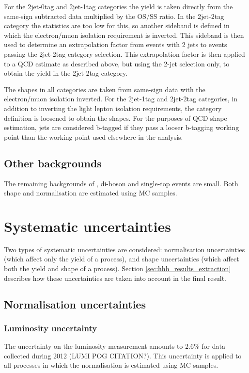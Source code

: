 For the 2jet-0tag and 2jet-1tag categories the yield is taken directly from
the same-sign subtracted data multiplied by the OS/SS ratio. In the 2jet-2tag
category the statistics are too low for this, so another sideband is defined
in which the electron/muon isolation requirement is inverted. This 
sideband is then used to determine an extrapolation factor from events
with 2 jets to events passing the 2jet-2tag category selection. This extrapolation
factor is then applied to a QCD estimate as described above, but using the 2-jet 
selection only, to obtain the yield in the 2jet-2tag category.

The shapes in all categories are taken from same-sign data with the electron/muon
isolation inverted. For the 2jet-1tag and 2jet-2tag categories, in addition to 
inverting the light lepton isolation requirements, the category definition
is loosened to obtain the shapes. For the purposes of QCD shape
estimation, jets are considered b-tagged if they pass a looser b-tagging
working point than the working point used elsewhere in the analysis.

\subsection{Other backgrounds}
\label{sec:hhh_backgrounds_other}
The remaining backgrounds of \Zellell, di-boson and single-top
events are small. Both shape and normalisation are
estimated using \ac{MC} samples.
 

\section{Systematic uncertainties}
\label{sec:hhh_uncs}
Two types of systematic uncertainties are considered: normalisation
uncertainties (which affect only the yield of a process), and shape
uncertainties (which affect both the yield and shape of a process). Section \ref{sec:hhh_results_extraction}
describes how these uncertainties are taken into account in the final result.

\subsection{Normalisation uncertainties}
\label{sec:hhh_uncs_norm}

\subsubsection*{Luminosity uncertainty}
The uncertainty on the luminosity measurement amounts to 2.6\% for data collected during
2012 (LUMI POG CITATION?). This uncertainty is applied to all processes in which
the normalisation is estimated using MC samples.

